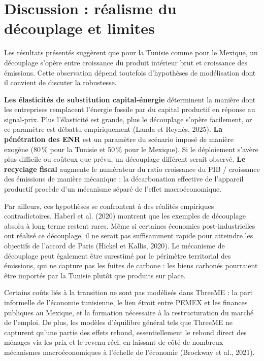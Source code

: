 \documentclass[12pt, a4paper]{article}
\begin{document}
\section{Discussion : réalisme du découplage et limites}
\label{sec:discussion}

Les résultats présentés suggèrent que pour la Tunisie comme pour le Mexique, un découplage s'opère entre croissance du produit intérieur brut et croissance des émissions. Cette observation dépend toutefois d'hypothèses de modélisation dont il convient de discuter la robustesse.

\textbf{Les élasticités de substitution capital-énergie} déterminent la manière dont les entreprises remplacent l'énergie fossile par du capital productif en réponse au signal-prix. Plus l'élasticité est grande, plus le découplage s'opère facilement, or ce paramètre est débattu empiriquement (Landa et Reynès, 2025). \textbf{La pénétration des ENR} est un paramètre du scénario imposé de manière exogène (80\,\% pour la Tunisie et 50\,\% pour le Mexique). Si le déploiement s'avère plus difficile ou coûteux que prévu, un découplage différent serait observé. \textbf{Le recyclage fiscal} augmente le numérateur du ratio croissance du PIB / croissance des émissions de manière mécanique ; la décarbonation effective de l'appareil productif procède d'un mécanisme séparé de l'effet macroéconomique.

Par ailleurs, ces hypothèses se confrontent à des réalités empiriques contradictoires. Haberl et al. (2020) montrent que les exemples de découplage absolu à long terme restent rares. Même si certaines économies post-industrielles ont réalisé ce découplage, il ne serait pas suffisamment rapide pour atteindre les objectifs de l'accord de Paris (Hickel et Kallis, 2020). Le mécanisme de découplage peut également être surestimé par le périmètre territorial des émissions, qui ne capture pas les fuites de carbone : les biens carbonés pourraient être importés par la Tunisie plutôt que produits sur place.

Certains coûts liés à la transition ne sont pas modélisés dans ThreeME : la part informelle de l'économie tunisienne, le lien étroit entre PEMEX et les finances publiques au Mexique, et la formation nécessaire à la restructuration du marché de l'emploi. De plus, les modèles d'équilibre général tels que ThreeME ne capturent qu'une partie des effets rebond, essentiellement le rebond direct des ménages via les prix et le revenu réel, en laissant de côté de nombreux mécanismes macroéconomiques à l'échelle de l'économie (Brockway et al., 2021).
\end{document}
